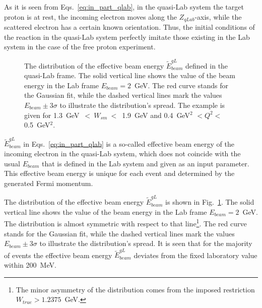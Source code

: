 As it is seen from Eqs.~\eqref{eq:in_part_qlab}, in the quasi-Lab system the target proton is at rest, the incoming electron moves along the $Z_{qLab}$-axis, while the scattered electron has a certain known orientation. Thus, the initial conditions of the reaction in the quasi-Lab system perfectly imitate those existing in the Lab system in the case of the free proton experiment. %

\begin{figure}[!ht]
\begin{center}
\end{center}
\caption{\small The distribution of the effective beam energy $\widetilde{E}_{beam}^{qL}$ defined in the quasi-Lab frame. The solid vertical line shows the value of the beam energy in the Lab frame $E_{beam} = 2$~GeV. The red curve stands for the Gaussian fit, while the dashed vertical lines mark the values $E_{beam}\pm3\sigma$ to illustrate the distribution's spread. The example is given for  1.3~GeV~$<~W_{sm}~<$~1.9~GeV and 0.4~GeV$^2$ $< Q^{2}<$ 0.5~GeV$^2$. }
\label{fig:e_beam_eff}
\end{figure}



$\widetilde{E}_{beam}^{qL}$ in Eqs.~\eqref{eq:in_part_qlab} is a so-called effective beam energy of the incoming electron in the quasi-Lab system, which does not coincide with the usual $E_{beam}$ that is defined in the Lab system and given as an input parameter. This effective beam energy is unique for each event and determined by the generated Fermi momentum.

The distribution of the effective beam energy $\widetilde{E}_{beam}^{qL}$ is shown in Fig.~\ref{fig:e_beam_eff}. The solid vertical line shows the value of the beam energy in the Lab frame $E_{beam} = 2$~GeV. The distribution is almost symmetric with respect to that line\footnote[6]{The minor asymmetry of the distribution comes from the imposed restriction $W_{true}>1.2375$~GeV.}. The red curve stands for the Gaussian fit, while the dashed vertical lines mark the values $E_{beam}\pm3\sigma$ to illustrate the distribution's spread. It is seen that for the majority of events the effective beam energy $\widetilde{E}_{beam}^{qL}$ deviates from the fixed laboratory value within 200~MeV.

